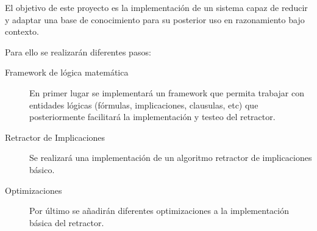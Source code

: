 	El objetivo de este proyecto es la implementación de un sistema capaz de reducir y adaptar una base de conocimiento para su posterior uso en razonamiento bajo contexto. 
	
	Para ello se realizarán diferentes pasos:

	\begin{description}
	
		\item[Framework de lógica matemática]
		En primer lugar se implementará un framework que permita trabajar con entidades lógicas (fórmulas, implicaciones, clausulas, etc)
		que posteriormente facilitará la implementación y testeo del retractor.
		
		\item[Retractor de Implicaciones]
		Se realizará una implementación de un algoritmo retractor de implicaciones básico.
		
		\item[Optimizaciones]
		Por último se añadirán diferentes optimizaciones a la implementación básica del retractor.
	
	\end{description}

 